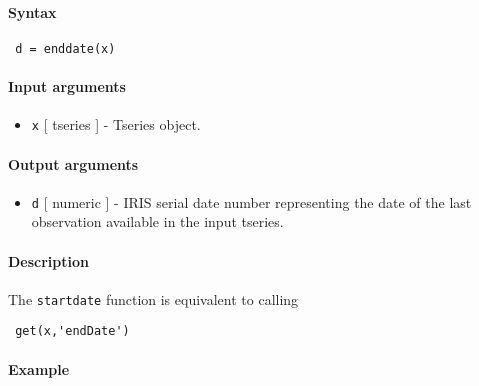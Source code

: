 


	\paragraph{Syntax}
 
 \begin{verbatim}
 d = enddate(x)
 \end{verbatim}
 
 \paragraph{Input arguments}
 
 \begin{itemize}
 \item
   \texttt{x} {[} tseries {]} - Tseries object.
 \end{itemize}
 
 \paragraph{Output arguments}
 
 \begin{itemize}
 \item
   \texttt{d} {[} numeric {]} - IRIS serial date number representing the
   date of the last observation available in the input tseries.
 \end{itemize}
 
 \paragraph{Description}
 
 The \texttt{startdate} function is equivalent to calling
 
 \begin{verbatim}
 get(x,'endDate')
 \end{verbatim}
 
 \paragraph{Example}


